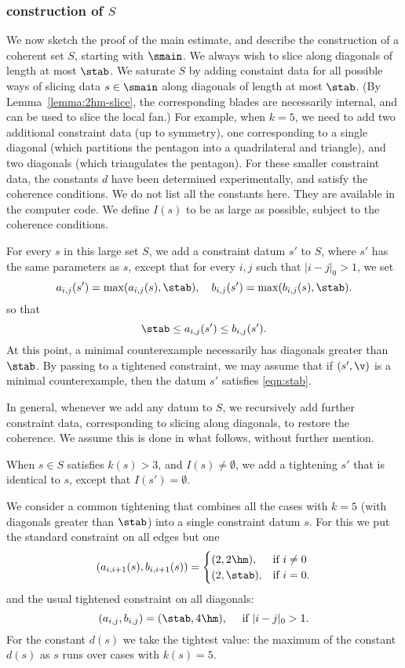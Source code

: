 \subsubsection{construction of $S$}

We now sketch the proof of the main estimate,
and describe the construction of a coherent set $S$, starting with $\smain$.
We always wish to slice along diagonals of length at most $\stab$. 
We saturate $S$ by adding constaint data for
all possible ways of  slicing data $s\in \smain$
along diagonals of length at most $\stab$.  (By Lemma~\ref{lemma:2hm-slice}, the
corresponding blades are necessarily internal, and can be used to
slice the local fan.)  For example, when $k=5$, we need to add two
additional constraint data (up to symmetry), one corresponding to a
single diagonal (which partitions the pentagon into a quadrilateral
and triangle), and two diagonals (which triangulates the pentagon).
For these smaller constraint data, the constants $d$ have been
determined experimentally, and satisfy the coherence conditions.  We
do not list all the constants here.  They are available in the
computer code.  We define $I(s)$ to be as large as possible, subject
to the coherence conditions.  

For every $s$ in this large set $S$, 
we add a constraint datum $s'$ to $S$, where $s'$ has
the same parameters as $s$, except that for every $i,j$ such that $|i-j|_0>1$,
we set
\begin{equation}\label{eqn:s'}
a_{i,j}(s') = \max(a_{i,j}(s),\stab),\quad b_{i,j}(s')=\max(b_{i,j}(s),\stab).
\end{equation}
so that
\begin{equation}\label{eqn:stab}
\stab \le a_{i,j}(s')\le b_{i,j}(s').
\end{equation}
At this point,  a minimal counterexample
necessarily has diagonals greater than $\stab$.  By passing to a tightened
constraint, we may assume that if $(s',\v)$ is a minimal counterexample,
then the datum $s'$ satisfies \eqref{eqn:stab}.

In general, whenever we add any datum to $S$, we recursively add
further constraint data, corresponding to slicing along diagonals,
to restore the coherence.  We assume this is done in what follows, without
further mention.

When $s\in S$ satisfies $k(s)>3$, and $I(s)\ne\emptyset$, we add a
tightening $s'$ that is identical to $s$, except that
$I(s')=\emptyset$.

We consider a common tightening that combines all the cases with $k=5$
(with diagonals greater than $\stab$) into a single constraint datum
$s$.  For this we put the standard constraint on all edges but one
\[
(a_{i,i+1}(s),b_{i,i+1}(s))=
\begin{cases}
(2,2\hm),&\text{if } i\ne 0\\
(2,\stab),&\text{if } i=0.
\end{cases}
\]
and the usual tightened constraint on all diagonals:
\[
(a_{i,j},b_{i,j})=(\stab,4\hm),\quad \text{ if } |i-j|_0>1.
\]
For the constant $d(s)$ we take the tightest value: the maximum of
the constant $d(s)$ as $s$ runs over cases with $k(s)=5$.


